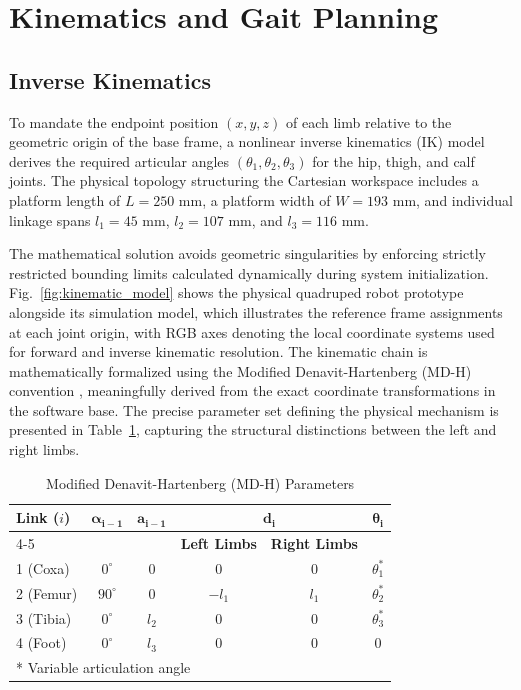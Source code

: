 \section{Kinematics and Gait Planning}

\subsection{Inverse Kinematics}

To mandate the endpoint position $(x, y, z)$ of each limb relative
to the geometric origin of the base frame, a nonlinear inverse
kinematics (IK) model \cite{craig2005introduction} derives the required articular angles
$(\theta_1, \theta_2, \theta_3)$ for the hip, thigh, and calf
joints. The physical topology structuring the Cartesian workspace
includes a platform length of $L=250$ mm, a platform width of
$W=193$ mm, and individual linkage spans $l_1=45$ mm, $l_2=107$ mm,
and $l_3=116$ mm.

The mathematical solution avoids geometric singularities by
enforcing strictly restricted bounding limits calculated dynamically
during system initialization. Fig.~\ref{fig:kinematic_model}
shows the physical quadruped robot prototype alongside its simulation model, 
which illustrates the reference frame assignments at each joint
origin, with RGB axes denoting the local coordinate systems
used for forward and inverse kinematic resolution. The kinematic 
chain is mathematically formalized using the Modified 
Denavit-Hartenberg (MD-H) convention \cite{craig2005introduction}, 
meaningfully derived from the exact coordinate transformations in the 
software base. The precise parameter set defining the physical mechanism is 
presented in Table~\ref{tab:mdh_parameters}, capturing the structural 
distinctions between the left and right limbs.

\begin{table}[htbp]
    \centering
    \caption{Modified Denavit-Hartenberg (MD-H) Parameters}
    \vspace{0.1cm}
    \def\arraystretch{1.4}
    \begin{tabular}{l c c c c c}
        \toprule
        \textbf{Link ($i$)} & $\boldsymbol{\alpha_{i-1}}$ & $\boldsymbol{a_{i-1}}$ & \multicolumn{2}{c}{$\boldsymbol{d_i}$} & $\boldsymbol{\theta_i}$ \\
        \cmidrule(lr){4-5}
        & & & \textbf{Left Limbs} & \textbf{Right Limbs} & \\
        \midrule
        1 (Coxa)  & $0^\circ$ & $0$   & $0$    & $0$   & $\theta_1^*$ \\
        2 (Femur) & $90^\circ$& $0$   & $-l_1$ & $l_1$ & $\theta_2^*$ \\
        3 (Tibia) & $0^\circ$ & $l_2$ & $0$    & $0$   & $\theta_3^*$ \\
        4 (Foot)  & $0^\circ$ & $l_3$ & $0$    & $0$   & $0$ \\
        \bottomrule
        \multicolumn{6}{l}{\small{* Variable articulation angle}} \\
    \end{tabular}
    \label{tab:mdh_parameters}
\end{table}

